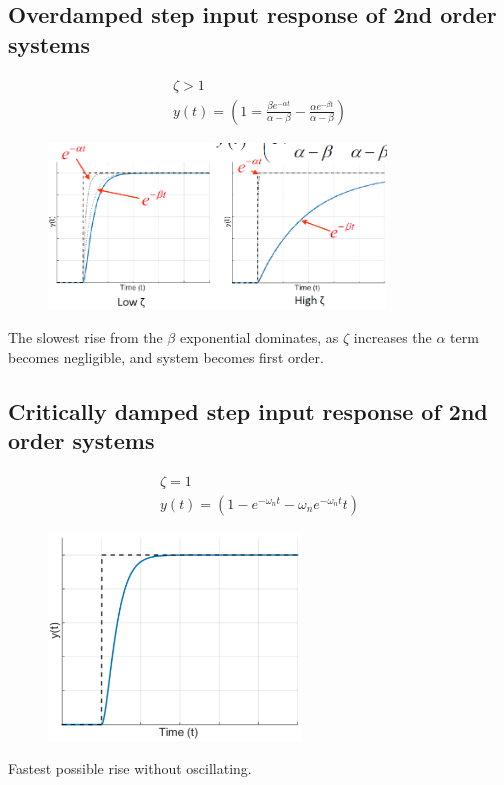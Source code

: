 \documentclass[class=report, crop=false, 12pt,a4paper]{standalone}
\begin{document}
\subsection{Overdamped step input response of 2nd order systems}
\begin{gather}
  \zeta > 1\\
  y(t) = \left(1 = \frac{\beta e^{-\alpha t}}{\alpha - \beta} - \frac{\alpha e^{-\beta t}}{\alpha - \beta}\right)
\end{gather}
\begin{figure}[H]
  \centering
  \includegraphics[width = 0.8\textwidth]{../img/diagram72.png}
\end{figure}
The slowest rise from the $\beta$ exponential dominates, as $\zeta$ increases the $\alpha$ term becomes negligible, and system becomes first order. 
\subsection{Critically damped step input response of 2nd order systems}
\begin{gather}
  \zeta = 1\\
  y(t) = \left(1 - e^{-\omega_n t} - \omega_n e ^{-\omega_n t} t\right)
\end{gather}
\begin{figure}[H]
  \centering
  \includegraphics[width = 0.6\textwidth]{../img/diagram73.png}
\end{figure}
Fastest possible rise without oscillating.
\end{document}
